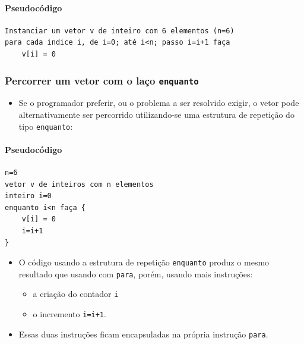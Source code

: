 \documentclass[12pt,a4paper]{article}
\providecommand{\tightlist}{%
      \setlength{\itemsep}{0pt}\setlength{\parskip}{0pt}}
\begin{document}
    \hypertarget{pseudocuxf3digo}{%
\paragraph{Pseudocódigo}\label{pseudocuxf3digo}}

    \begin{verbatim}
Instanciar um vetor v de inteiro com 6 elementos (n=6)
para cada indice i, de i=0; até i<n; passo i=i+1 faça
    v[i] = 0
\end{verbatim}

    \hypertarget{percorrer-um-vetor-com-o-lauxe7o-enquanto}{%
\subsubsection{\texorpdfstring{Percorrer um vetor com o laço
\texttt{enquanto}}{Percorrer um vetor com o laço enquanto}}\label{percorrer-um-vetor-com-o-lauxe7o-enquanto}}

    \begin{itemize}
\tightlist
\item
  Se o programador preferir, ou o problema a ser resolvido exigir, o
  vetor pode alternativamente ser percorrido utilizando-se uma estrutura
  de repetição do tipo \texttt{enquanto}:
\end{itemize}

    \hypertarget{pseudocuxf3digo}{%
\paragraph{Pseudocódigo}\label{pseudocuxf3digo}}

    \begin{verbatim}
n=6
vetor v de inteiros com n elementos 
inteiro i=0
enquanto i<n faça {
    v[i] = 0
    i=i+1
}
\end{verbatim}

    \begin{itemize}
\tightlist
\item
  O código usando a estrutura de repetição \texttt{enquanto} produz o
  mesmo resultado que usando com \texttt{para}, porém, usando mais
  instruções:

  \begin{itemize}
  \tightlist
  \item
    a criação do contador \texttt{i}
  \item
    o incremento \texttt{i=i+1}.
  \end{itemize}
\item
  Essas duas instruções ficam encapsuladas na própria instrução
  \texttt{para}.
\end{itemize}
\end{document}
